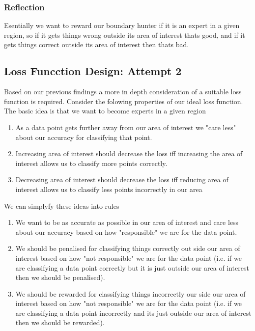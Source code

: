 \documentclass{article}
\begin{document}
\subsubsection{Reflection}
Esentially we want to reward our boundary hunter if it is an expert in a given region, so if it gets things wrong outside its area of interest thats good, and if it gets things correct outside its area of interest then thats bad.

\subsection{Loss Funcction Design: Attempt 2}
Based on our previous findings a more in depth consideration of a suitable loss function is required. Consider the folowing properties of our ideal loss function. The basic idea is that we want to become experts in a given region
\begin{enumerate}
\item As a data point gets further away from our area of interest we "care less" about our accuracy for classifying that point.
\item Increasing area of interest should decrease the loss iff increasing the area of interest allows us to classify more points correctly.
\item Decreasing area of interest should decrease the loss iff reducing area of interest allows us to classify less points incorrectly in our area
\end{enumerate}

We can simplyfy these ideas into rules

\begin{enumerate}
\item We want to be as accurate as possible in our area of interest and care less about our accuracy based on how "responsible" we are for the data point.
\item We should be penalised for classifying things correctly out side our area of interest based on how "not responsible" we are for the data point (i.e. if we are classifying a data point correctly but it is just outside our area of interest then we should be penalised).
\item We should be rewarded for classifying things incorrectly our side our area of interest based on how "not responsible" we are for the data point (i.e. if we are classifying a data point incorrectly and its just outside our area of interest then we should be rewarded).
\end{enumerate}
\end{document}
